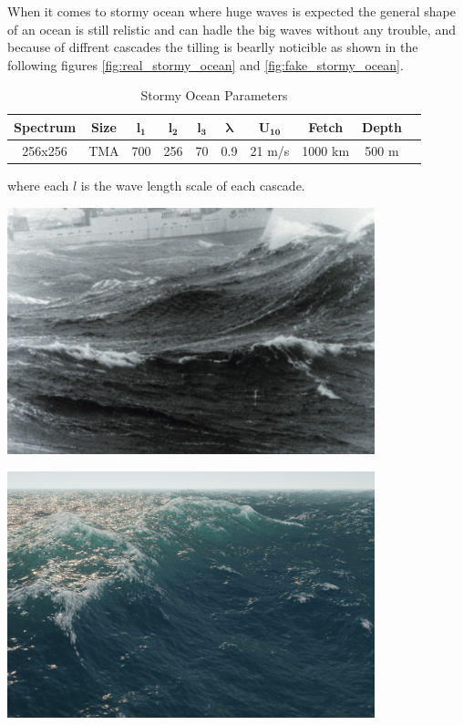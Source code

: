 When it comes to stormy ocean where huge waves is expected the general shape of an ocean is still relistic
and can hadle the big waves without any trouble, and because of diffrent cascades the tilling is bearlly noticible as shown in the following figures \ref{fig:real_stormy_ocean} and \ref{fig:fake_stormy_ocean}.
\begin{table}[h]
    \centering
    \begin{tabular}{|c|c|c|c|c|c|c|c|c|c|}
        \hline
        \textbf{Spectrum} & \textbf{Size} & $\mathbf{l_1}$ & $\mathbf{l_2}$ & $\mathbf{l_3}$ & $\mathbf{\lambda}$ & $\mathbf{U_{10}}$ & \textbf{Fetch} & \textbf{Depth} \\
        \hline
        256x256 & TMA & 700 & 256 & 70 & 0.9 & 21 m/s & 1000 km & 500 m \\
        \hline
    \end{tabular}
    \caption{Stormy Ocean Parameters}
    \label{tab:stormy_ocean}
\end{table}
where each $l$ is the wave length scale of each cascade.

\begin{minipage}{0.48\textwidth}
    \centering
    \includegraphics[width=0.8\textwidth]{"images/real_stormy_ocean.png"}
    \captionsetup{justification=centering}
    \label{fig:real_stormy_ocean}
\end{minipage}
\hfill
\begin{minipage}{0.48\textwidth}
    \centering
    \includegraphics[width=0.8\textwidth]{"images/fake_stormy_ocean.png"}
    \label{fig:fake_stormy_ocean}
\end{minipage}

